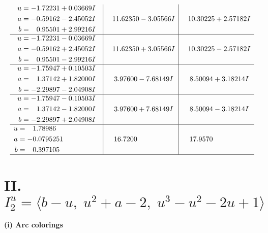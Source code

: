 \documentclass[1p]{elsarticle_modified}
\theoremstyle{definition}
\begin{document}
$$\begin{array}{c|c|c}
\begin{aligned}
u &= -1.72231 + 0.03669 I \\
a &= -0.59162 - 2.45052 I \\
b &= \phantom{-}0.95501 + 2.99216 I\end{aligned}
 & \phantom{-}11.62350 - 3.05566 I & \phantom{-}10.30225 + 2.57182 I \\ \hline\begin{aligned}
u &= -1.72231 - 0.03669 I \\
a &= -0.59162 + 2.45052 I \\
b &= \phantom{-}0.95501 - 2.99216 I\end{aligned}
 & \phantom{-}11.62350 + 3.05566 I & \phantom{-}10.30225 - 2.57182 I \\ \hline\begin{aligned}
u &= -1.75947 + 0.10503 I \\
a &= \phantom{-}1.37142 + 1.82000 I \\
b &= -2.29897 - 2.04908 I\end{aligned}
 & \phantom{-}3.97600 - 7.68149 I & \phantom{-}8.50094 + 3.18214 I \\ \hline\begin{aligned}
u &= -1.75947 - 0.10503 I \\
a &= \phantom{-}1.37142 - 1.82000 I \\
b &= -2.29897 + 2.04908 I\end{aligned}
 & \phantom{-}3.97600 + 7.68149 I & \phantom{-}8.50094 - 3.18214 I \\ \hline\begin{aligned}
u &= \phantom{-}1.78986\phantom{ +0.000000I} \\
a &= -0.0795251\phantom{ +0.000000I} \\
b &= \phantom{-}0.397105\phantom{ +0.000000I}\end{aligned}
 & \phantom{-}16.7200\phantom{ +0.000000I} & \phantom{-}17.9570\phantom{ +0.000000I}\\
 \hline 
 \end{array}$$\newpage\newpage\renewcommand{\arraystretch}{1}
\centering \section*{II. $I^u_{2}= \langle b- u,\;u^2+a-2,\;u^3- u^2-2 u+1 \rangle$}
\flushleft \textbf{(i) Arc colorings}\\
\end{document}
